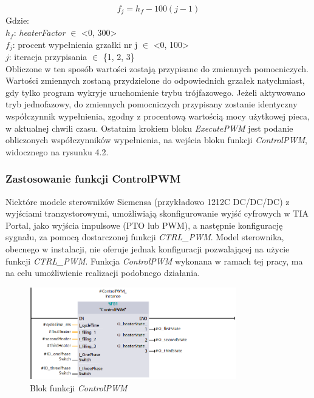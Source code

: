 \documentclass[a4paper,twoside,12pt]{book}
\begin{document}
\[ f_j = h_f - 100(j - 1)\]
\noindent Gdzie:\\
$h_f$: \textit{heaterFactor} $\in$ <0, 300>\\
$f_j$: procent wypełnienia grzałki nr j $\in$ <0, 100>\\
$j$: iteracja przypisania $\in$ \{1, 2, 3\}\\

\noindent Obliczone w ten sposób wartości zostają przypisane do zmiennych pomocniczych. Wartości zmiennych zostaną przydzielone do odpowiednich grzałek natychmiast, gdy tylko program wykryje uruchomienie trybu trójfazowego. Jeżeli aktywowano tryb jednofazowy, do zmiennych pomocniczych przypisany zostanie identyczny współczynnik wypełnienia, zgodny z procentową wartością mocy użytkowej pieca, w aktualnej chwili czasu. Ostatnim krokiem bloku \textit{ExecutePWM} jest podanie obliczonych współczynników wypełnienia, na wejścia bloku funkcji \textit{ControlPWM}, widocznego na rysunku 4.2.\\

\subsubsection{Zastosowanie funkcji ControlPWM}
Niektóre modele sterowników Siemensa (przykładowo 1212C DC/DC/DC) z wyjściami tranzystorowymi, umożliwiają skonfigurowanie wyjść cyfrowych w TIA Portal, jako wyjścia impulsowe (PTO lub PWM), a następnie konfigurację sygnału, za pomocą dostarczonej funkcji \textit{CTRL\_PWM}. Model sterownika, obecnego w instalacji, nie oferuje jednak konfiguracji pozwalającej na użycie funkcji \textit{CTRL\_PWM}. Funkcja \textit{ControlPWM} wykonana w ramach tej pracy, ma na celu umożliwienie realizacji podobnego działania.

\newpage
\begin{figure}[h]
	\centering
	\includegraphics[width=0.8\textwidth]{./img/ControlPWM.png}
	\caption{Blok funkcji \textit{ControlPWM}}
	\label{fig:ControlPWM}
\end{figure}
\end{document}
